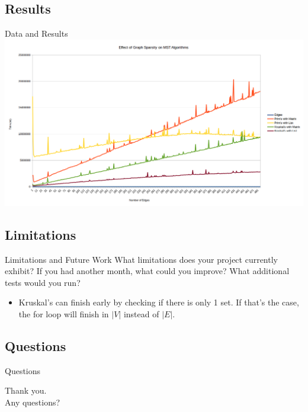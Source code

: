 \documentclass{beamer}
\begin{document}
\subsection{Results}
\begin{frame}{Data and Results}
    \includegraphics[width=\textwidth]{widegraph}
\end{frame}

\subsection{Limitations}
\begin{frame}{Limitations and Future Work}
    What limitations does your project currently exhibit? If you had another
    month, what could you improve? What additional tests would you run?

    \begin{itemize}
    \item Kruskal's can finish early by checking if there is only 1 set. If
    that's the case, the for loop will finish in $|V|$ instead of $|E|$.
    \end{itemize}
\end{frame}

\subsection{Questions}
\begin{frame}{Questions}
    \begin{center}
    Thank you.\\
    Any questions?
    \end{center}
\end{frame}
\end{document}
